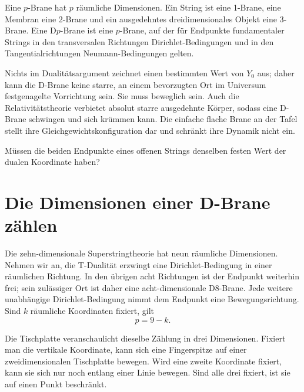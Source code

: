Eine \(p\)-Brane hat \(p\) räumliche Dimensionen. Ein String ist eine 1-Brane, eine Membran eine 2-Brane und ein ausgedehntes dreidimensionales Objekt eine 3-Brane. Eine D\(p\)-Brane ist eine \(p\)-Brane, auf der für Endpunkte fundamentaler Strings in den transversalen Richtungen Dirichlet-Bedingungen und in den Tangentialrichtungen Neumann-Bedingungen gelten.

Nichts im Dualitätsargument zeichnet einen bestimmten Wert von \(Y_0\) aus; daher kann die D-Brane keine starre, an einem bevorzugten Ort im Universum festgenagelte Vorrichtung sein. Sie muss beweglich sein. Auch die Relativitätstheorie verbietet absolut starre ausgedehnte Körper, sodass eine D-Brane schwingen und sich krümmen kann. Die einfache flache Brane an der Tafel stellt ihre Gleichgewichtskonfiguration dar und schränkt ihre Dynamik nicht ein.

\begin{classroomqa}Müssen die beiden Endpunkte eines offenen Strings denselben festen Wert der dualen Koordinate haben? 
\end{classroomqa}

\section{Die Dimensionen einer D-Brane zählen}

Die zehn-dimensionale Superstringtheorie hat neun räumliche Dimensionen. Nehmen wir an, die T-Dualität erzwingt eine Dirichlet-Bedingung in einer räumlichen Richtung. In den übrigen acht Richtungen ist der Endpunkt weiterhin frei; sein zulässiger Ort ist daher eine acht-dimensionale D8-Brane. Jede weitere unabhängige Dirichlet-Bedingung nimmt dem Endpunkt eine Bewegungsrichtung. Sind \(k\) räumliche Koordinaten fixiert, gilt
\begin{equation}
  p=9-k.
  \label{eq:l10-dp-counting}
\end{equation}

Die Tischplatte veranschaulicht dieselbe Zählung in drei Dimensionen. Fixiert man die vertikale Koordinate, kann sich eine Fingerspitze auf einer zweidimensionalen Tischplatte bewegen. Wird eine zweite Koordinate fixiert, kann sie sich nur noch entlang einer Linie bewegen. Sind alle drei fixiert, ist sie auf einen Punkt beschränkt.

